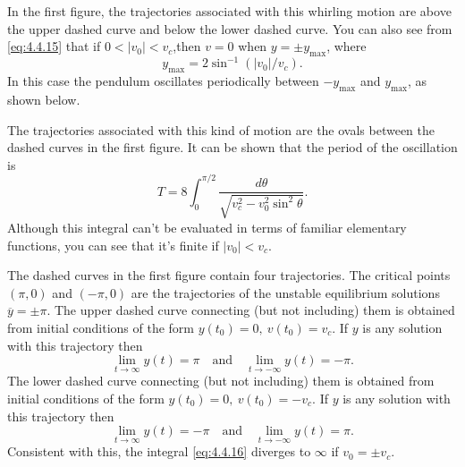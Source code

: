\documentclass{ximera}
\begin{document}
\begin{example}
 
 
In the first figure, the trajectories associated with this
whirling motion are above the upper dashed curve and below the lower
dashed curve. You can also see from
\eqref{eq:4.4.15} that if $0<|v_0|<v_c$,then $v=0$ when $y=\pm y_{\max}$,
where
$$
y_{\max}=2\sin^{-1}(|v_0|/v_c).
$$
In this case the pendulum oscillates periodically between $-y_{\max}$
and $y_{\max}$, as shown below.

\begin{center}
  \end{center}
 
 
 
The
trajectories associated with this kind of motion are the ovals between
the dashed curves in the first figure. It can be shown %
that the period of the
oscillation is
\begin{equation} \label{eq:4.4.16}
T=8\int_0^{\pi/2}\frac{d\theta}{\sqrt{v_c^2-v_0^2\sin^2\theta}}.
\end{equation}
Although this integral can't be evaluated in terms of familiar
elementary functions, you can see that it's finite if $|v_0|<v_c$.
 
The dashed curves in the first figure contain four
trajectories. The critical points $(\pi,0)$ and $(-\pi,0)$ are the
trajectories of the unstable equilibrium solutions $\overline
y=\pm\pi$.
The upper dashed curve connecting (but not including) them is obtained
from initial conditions of the form $y(t_0)=0,\ v(t_0)=v_c$. If $y$ is
any solution with this trajectory then
$$
\lim_{t\rightarrow\infty}y(t)=\pi\quad\mbox{and}\quad\lim_{t\rightarrow-\infty}y(t)=-\pi.
$$
The lower dashed curve connecting (but not including) them is obtained
from initial conditions of the form $y(t_0)=0,\ v(t_0)=-v_c$. If $y$
is any solution with this trajectory then
$$
\lim_{t\rightarrow\infty}y(t)=-\pi\quad\mbox{and}\quad\lim_{t\rightarrow-\infty}y(t)=\pi.
$$
Consistent with this, the integral \eqref{eq:4.4.16} diverges to $\infty$
if $v_0=\pm v_c$. %
 

\end{example}
\end{document}
